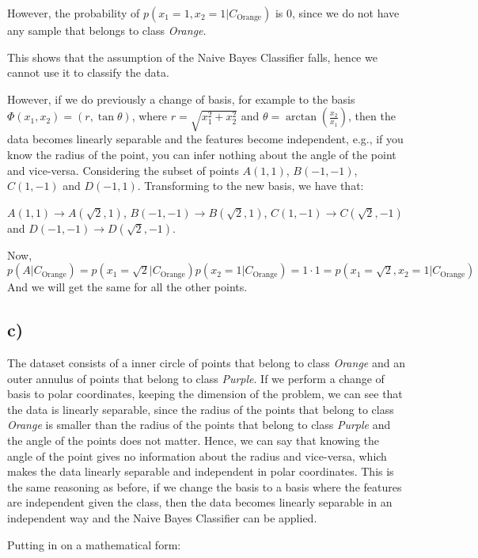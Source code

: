 \documentclass[12pt,a4paper,oneside]{paper}
\begin{document}
However, the probability of $p(x_1 = 1, x_2 = 1 | C_{\text{Orange}})$ is 0, since we do not have any sample that belongs to class \textit{Orange}. 

This shows that the assumption of the Naive Bayes Classifier falls, hence we cannot use it to classify the data.

However, if we do previously a change of basis, for example to the basis $\Phi(x_1, x_2) = (r, \tan \theta)$, where $r = \sqrt{x_1^2 + x_2^2}$ and $\theta = \arctan\left(\frac{x_2}{x_1}\right)$,
then the data becomes linearly separable and the features become independent, e.g., if you know the radius of the point, you can infer nothing about the angle of the point and vice-versa.
Considering the subset of points $A (1, 1)$, $B (-1, -1)$, $C (1, -1)$ and $D (-1, 1)$. Transforming to the new basis, we have that:

$A(1, 1) \rightarrow A(\sqrt{2}, 1)$, $B(-1, -1) \rightarrow B(\sqrt{2}, 1)$, $C(1, -1) \rightarrow C(\sqrt{2}, -1)$ and $D(-1, -1) \rightarrow D(\sqrt{2}, -1)$.

Now, 
$p(A | C_{\text{Orange}}) = p(x_1 = \sqrt{2} | C_{\text{Orange}}) p(x_2 = 1 | C_{\text{Orange}}) = 1 \cdot 1 = p(x_1 = \sqrt{2}, x_2 = 1 | C_{\text{Orange}})$
And we will get the same for all the other points.

\newpage
\subsection*{c)}

The dataset consists of a inner circle of points that belong to class \textit{Orange} and
an outer annulus of points that belong to class \textit{Purple}. If we perform a change of basis to polar coordinates,
keeping the dimension of the problem, we can see that the data is linearly separable, since the radius of the points
that belong to class \textit{Orange} is smaller than the radius of the points that belong to class \textit{Purple} and the
angle of the points does not matter. Hence, we can say that knowing the angle of the point gives no information
about the radius and vice-versa, which makes the data linearly separable and independent in polar coordinates. This is the same reasoning as before,
if we change the basis to a basis where the features are independent given the class, then the data becomes linearly separable in an independent way and the Naive Bayes Classifier can be applied.

Putting in on a mathematical form:
\end{document}
